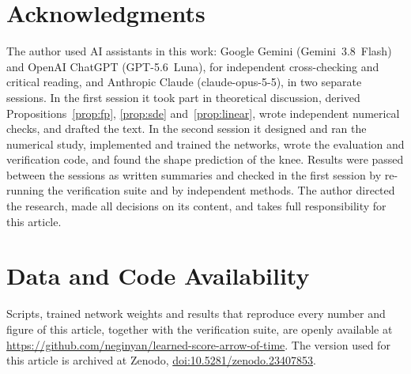 \section*{Acknowledgments}
The author used AI assistants in this work: Google Gemini (\mbox{Gemini 3.8 Flash}) and OpenAI ChatGPT (\mbox{GPT-5.6 Luna}), for independent cross-checking and critical reading, and Anthropic Claude (\mbox{claude-opus-5-5}), in two separate sessions. In the first session it took part in theoretical discussion, derived Propositions~\ref{prop:fp}, \ref{prop:sde} and~\ref{prop:linear}, wrote independent numerical checks, and drafted the text. In the second session it designed and ran the numerical study, implemented and trained the networks, wrote the evaluation and verification code, and found the shape prediction of the knee. Results were passed between the sessions as written summaries and checked in the first session by re-running the verification suite and by independent methods. The author directed the research, made all decisions on its content, and takes full responsibility for this article.

\section*{Data and Code Availability}
Scripts, trained network weights and results that reproduce every number and figure of this article, together with the verification suite, are openly available at \url{https://github.com/neginyan/learned-score-arrow-of-time}. The version used for this article is archived at Zenodo, \href{https://doi.org/10.5281/zenodo.23407853}{doi:10.5281/zenodo.23407853}.
